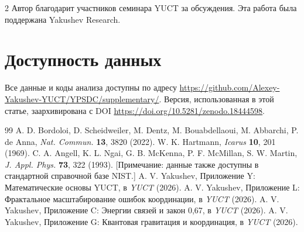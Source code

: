 \documentclass[11pt,a4paper]{article}
\begin{document}
\begin{multicols}{2}
		Автор благодарит участников семинара YUCT за обсуждения. Эта работа была поддержана Yakushev Research.
		
		\section*{Доступность данных}
		Все данные и коды анализа доступны по адресу \url{https://github.com/Alexey-Yakushev-YUCT/YPSDC/supplementary/}. Версия, использованная в этой статье, заархивирована с DOI \url{https://doi.org/10.5281/zenodo.18444598}.
		
		\begin{thebibliography}{99}
			 A. D. Bordoloi, D. Scheidweiler, M. Dentz, M. Bouabdellaoui, M. Abbarchi, P. de Anna, \emph{Nat. Commun.} \textbf{13}, 3820 (2022).
			 W. K. Hartmann, \emph{Icarus} \textbf{10}, 201 (1969).
			 C. A. Angell, K. L. Ngai, G. B. McKenna, P. F. McMillan, S. W. Martin, \emph{J. Appl. Phys.} \textbf{73}, 322 (1993). [Примечание: данные также доступны в стандартной справочной базе NIST.]
			 A. V. Yakushev, Приложение Y: Математические основы YUCT, в \emph{YUCT} (2026).
			 A. V. Yakushev, Приложение L: Фрактальное масштабирование ошибок координации, в \emph{YUCT} (2026).
			 A. V. Yakushev, Приложение C: Энергии связей и закон 0,67, в \emph{YUCT} (2026).
			 A. V. Yakushev, Приложение G: Квантовая гравитация и координация, в \emph{YUCT} (2026).
		\end{thebibliography}
		
	\end{multicols}
\end{document}
